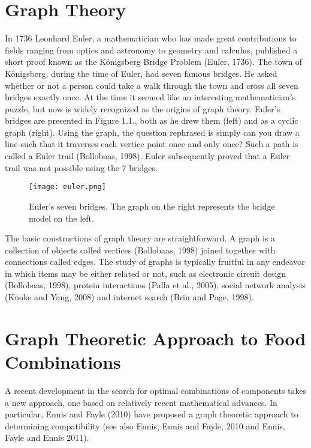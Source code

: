 \section{Graph Theory}
In 1736 Leonhard Euler, a mathematician who has made great contributions to fields ranging from optics and astronomy to geometry and calculus, published a short proof known as the K\"{o}nigsberg Bridge Problem (Euler, 1736). The town of K\"{o}nigsberg, during the time of Euler, had seven famous bridges.  He asked whether or not a person could take a walk through the town and cross all seven bridges exactly once.  At the time it seemed like an interesting mathematician’s puzzle, but now is widely recognized as the origins of graph theory. Euler’s bridges are presented in Figure 1.1., both as he drew them (left) and as a cyclic graph (right).  Using the graph, the question rephrased is simply can you draw a line such that it traverses each vertice point once and only once?  Such a path is called a Euler trail (Bollobaas, 1998).  Euler subsequently proved that a Euler trail was not possible using the 7 bridges.

\begin{figure}[h!]
\caption{Euler's seven bridges.  The graph on the right represents the bridge model on the left.}
\centering
\texttt{[image: euler.png]}
\end{figure}


The basic constructions of graph theory are straightforward.  A graph is a collection of objects called vertices (Bollobaas, 1998) joined together with connections called edges.  The study of graphs is typically fruitful in any endeavor in which items may be either related or not, such as electronic circuit design (Bollobaas, 1998),  protein interactions (Palla et al., 2005), social network analysis (Knoke and Yang, 2008) and internet search (Brin and Page, 1998).  

\section{Graph Theoretic Approach to Food Combinations}
A recent development in the search for optimal combinations of components takes a new approach, one based on relatively recent mathematical advances.  In particular, Ennis and Fayle (2010) have proposed a graph theoretic approach to determining compatibility (see also Ennis, Ennis and Fayle, 2010 and Ennis, Fayle and Ennis 2011).

